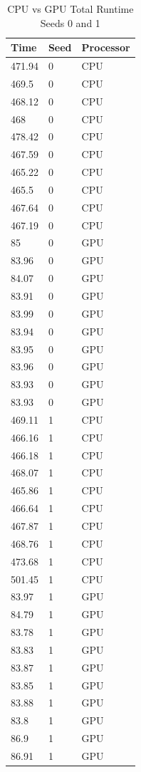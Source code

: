 \begin{table}
\caption{CPU vs GPU Total Runtime Seeds 0 and 1}
\centering
 \begin{tabular}{ | l | l | l |}
    \hline
    Time & Seed & Processor \\ \hline
    471.94 & 0 & CPU \\ \hline
    469.5 & 0 & CPU \\ \hline
    468.12 & 0 & CPU \\ \hline
    468 & 0 & CPU \\ \hline
    478.42 & 0 & CPU \\ \hline
    467.59 & 0 & CPU \\ \hline
    465.22 & 0 & CPU \\ \hline
    465.5 & 0 & CPU \\ \hline
    467.64 & 0 & CPU \\ \hline
    467.19 & 0 & CPU \\ \hline
    85 & 0 & GPU \\ \hline
    83.96 & 0 & GPU \\ \hline
    84.07 & 0 & GPU \\ \hline
    83.91 & 0 & GPU \\ \hline
    83.99 & 0 & GPU \\ \hline
    83.94 & 0 & GPU \\ \hline
    83.95 & 0 & GPU \\ \hline
    83.96 & 0 & GPU \\ \hline
    83.93 & 0 & GPU \\ \hline
    83.93 & 0 & GPU \\ \hline
    469.11 & 1 & CPU \\ \hline
    466.16 & 1 & CPU \\ \hline
    466.18 & 1 & CPU \\ \hline
    468.07 & 1 & CPU \\ \hline
    465.86 & 1 & CPU \\ \hline
    466.64 & 1 & CPU \\ \hline
    467.87 & 1 & CPU \\ \hline
    468.76 & 1 & CPU \\ \hline
    473.68 & 1 & CPU \\ \hline
    501.45 & 1 & CPU \\ \hline
    83.97 & 1 & GPU \\ \hline
    84.79 & 1 & GPU \\ \hline
    83.78 & 1 & GPU \\ \hline
    83.83 & 1 & GPU \\ \hline
    83.87 & 1 & GPU \\ \hline
    83.85 & 1 & GPU \\ \hline
    83.88 & 1 & GPU \\ \hline
    83.8 & 1 & GPU \\ \hline
    86.9 & 1 & GPU \\ \hline
    86.91 & 1 & GPU \\ \hline
    \end{tabular}
\label{table:CPU vs GPU total runtime}
\end{table}

